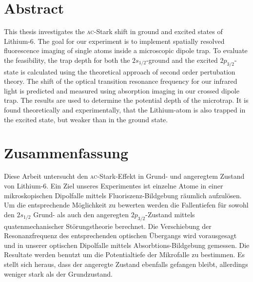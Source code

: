 \section*{Abstract}

This thesis investigates the \textsc{ac}-Stark shift in ground and excited states of Lithium-6. 
The goal for our experiment is to implement spatially resolved fluorescence imaging of single atoms inside a microscopic dipole trap. To evaluate the feasibility, the trap depth for both the $2s_{1/2}$-ground and the excited $2p_{3/2}$-state is calculated using the theoretical approach of second order pertubation theory. The shift of the optical transition resonance frequency for our infrared light is predicted and measured using absorption imaging in our crossed dipole trap. The results are used to determine the potential depth of the microtrap. It is found theoretically and experimentally, that the Lithium-atom is also trapped in the excited state, but weaker than in the ground state.

\section*{Zusammenfassung}

Diese Arbeit untersucht den \textsc{ac}-Stark-Effekt in Grund- und angeregtem Zustand von Lithium-6. Ein Ziel unseres Experimentes ist einzelne Atome in einer mikroskopischen Dipolfalle mittels Fluoriszenz-Bildgebung räumlich aufzulösen. Um die entsprechende Möglichkeit zu bewerten werden die Fallentiefen für sowohl den $2s_{1/2}$ Grund- als auch den angeregten $2p_{3/2}$-Zustand mittels quatenmechanischer Störungstheorie berechnet. Die Verschiebung der Resonanzfrequenz des entsprechenden optischen Übergangs wird vorausgesagt und in unserer optischen Dipolfalle mittels Absorbtions-Bildgebung gemessen. Die Resultate werden benutzt um die Potentialtiefe der Mikrofalle zu bestimmen. Es stellt sich heraus, dass der angeregte Zustand ebenfalls gefangen bleibt, allerdings weniger stark als der Grundzustand.